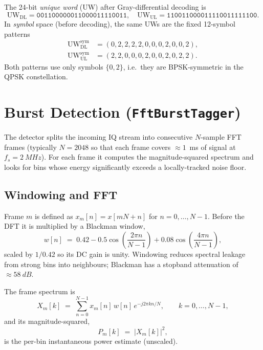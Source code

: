 \documentclass[11pt,a4paper]{article}
\begin{document}
The 24-bit \emph{unique word} (UW) after Gray-differential decoding is
\begin{equation}
\text{UW}_{\text{DL}} = \texttt{001100000011000011110011}, \quad
\text{UW}_{\text{UL}} = \texttt{110011000011110011111100}.
\end{equation}
In \emph{symbol} space (before decoding), the same UWs are the fixed
12-symbol patterns
\begin{align}
\text{UW}_{\text{DL}}^\text{sym} &= (0,2,2,2,2,0,0,0,2,0,0,2), \\
\text{UW}_{\text{UL}}^\text{sym} &= (2,2,0,0,0,2,0,0,2,0,2,2).
\end{align}
Both patterns use only symbols $\{0, 2\}$, i.e.\ they are BPSK-symmetric
in the QPSK constellation.

\section{Burst Detection (\texttt{FftBurstTagger})}

The detector splits the incoming IQ stream into consecutive
$N$-sample FFT frames (typically $N = 2048$ so that each frame covers
$\approx 1$~ms of signal at $f_s = \SI{2}{MHz}$). For each frame it
computes the magnitude-squared spectrum and looks for bins whose energy
significantly exceeds a locally-tracked noise floor.

\subsection{Windowing and FFT}

Frame $m$ is defined as $x_m[n] = x[m N + n]$ for $n = 0, \ldots, N-1$.
Before the DFT it is multiplied by a Blackman window,
\begin{equation}
w[n] \;=\; 0.42 - 0.5\cos\!\left(\frac{2\pi n}{N-1}\right)
         + 0.08\cos\!\left(\frac{4\pi n}{N-1}\right),
\end{equation}
scaled by $1/0.42$ so its DC gain is unity. Windowing reduces spectral
leakage from strong bins into neighbours; Blackman has a stopband
attenuation of $\approx \SI{58}{dB}$.

The frame spectrum is
\begin{equation}
X_m[k] \;=\; \sum_{n=0}^{N-1} x_m[n]\, w[n]\, e^{-j 2\pi k n / N},
\qquad k = 0, \ldots, N-1,
\end{equation}
and its magnitude-squared,
\begin{equation}
P_m[k] \;=\; \bigl|X_m[k]\bigr|^2,
\end{equation}
is the per-bin instantaneous power estimate (unscaled).
\end{document}
